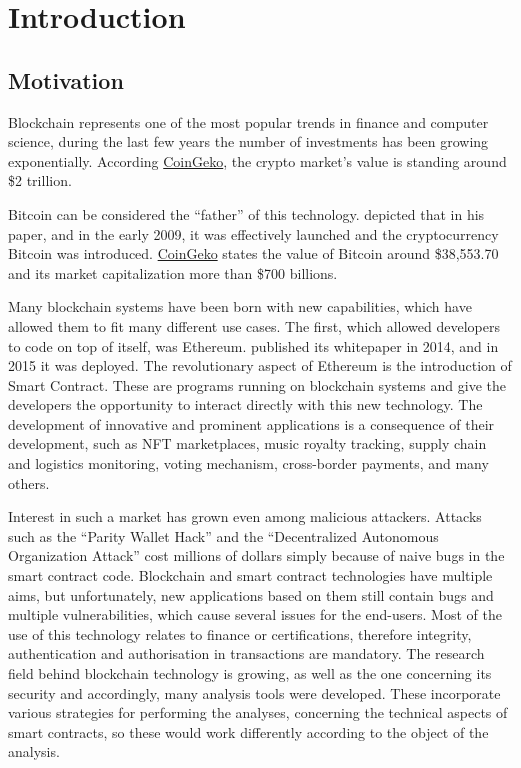 \chapter{Introduction}
\label{ch:Introduction}


\section{Motivation}
\label{sec:Introduction:Motivation}

Blockchain represents one of the most popular trends in finance and computer science, 
during the last few years the number of investments has been growing exponentially. 
According \href{https://www.coingecko.com/}{CoinGeko}, the crypto market's value is standing around \$2 trillion.

Bitcoin can be considered the “father” of this technology. \citet{Bitcoin} depicted that in his paper, and in the early 2009,
it was effectively launched and the cryptocurrency Bitcoin was introduced. 
\href{https://www.coingecko.com/}{CoinGeko} states the value of Bitcoin around \$38,553.70 and its market capitalization more than  \$700 billions.

Many blockchain systems have been born with new capabilities, 
which have allowed them to fit many different use cases. The first, which allowed developers to 
code on top of itself, was Ethereum.
\citet{Ethereum} published its whitepaper in 2014, and in 2015 it was deployed.
The revolutionary aspect of Ethereum is the introduction of Smart Contract.
These are programs running on blockchain systems and give the developers the opportunity to interact directly 
with this new technology. 
The development of innovative and prominent applications is a consequence of their development, such as NFT marketplaces, music royalty tracking, supply chain and logistics monitoring, voting mechanism, 
cross-border payments, and many others.  

Interest in such a market has grown even among malicious attackers. 
Attacks such as the “Parity Wallet Hack” and the “Decentralized Autonomous Organization Attack” cost millions of dollars simply because of 
naive bugs in the smart contract code. Blockchain and smart contract technologies have multiple aims, but unfortunately, new applications 
based on them still contain bugs and multiple vulnerabilities, which cause 
several issues for the end-users. Most of the use of this technology relates to finance or certifications, therefore integrity, 
authentication and authorisation in transactions are mandatory. The research field behind blockchain technology is growing, as well as the one concerning 
its security and accordingly, many analysis tools were developed. 
These incorporate various strategies for performing the analyses, concerning the technical aspects of smart contracts, 
so these would work differently according to the object of the analysis. 

